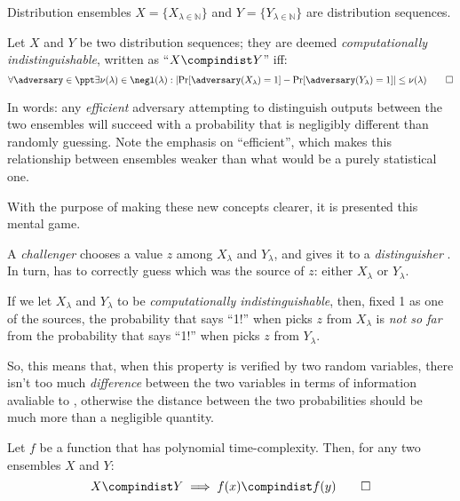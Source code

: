 Distribution ensembles $X = \{X_{\lambda \in \mathbb{N}}\}$ and $Y = \{Y_{\lambda \in \mathbb{N}}\}$ are distribution sequences.

\begin{definition}
    Let $X$ and $Y$ be two distribution sequences; they are deemed \emph{computationally indistinguishable}, written as ``$X \compindist Y$'' iff:
    \[
        \forall \adversary \in \ppt \exists \nu(\lambda) \in \negl(\lambda) : \left|\Pr[\adversary(X_\lambda) = 1] - \Pr[\adversary(Y_\lambda) = 1]\right| \leq \nu(\lambda) \qedhere
    \]
\end{definition}

In words: any \emph{efficient} adversary attempting to distinguish outputs between the two ensembles will succeed with a probability that is negligibly different than randomly guessing. Note the emphasis on ``efficient'', which makes this relationship between ensembles weaker than what would be a purely statistical one.

With the purpose of making these new concepts clearer, it is presented this mental game.


A \emph{challenger} \challenger{} chooses a value $z$ among $X_\lambda$ and $Y_\lambda$, and gives it to a \emph{distinguisher} \distinguisher{}. In turn, \distinguisher{} has to correctly guess which was the source of $z$: either $X_\lambda$ or $Y_\lambda$. 

If we let $X_\lambda$ and $Y_\lambda$ to be \emph{computationally indistinguishable}, then, fixed 1 as one of the sources, the probability that \distinguisher{} says ``1!'' when \challenger{} picks $z$ from $X_\lambda$ is \emph{not so far} from the probability that \distinguisher{} says ``1!'' when \challenger{} picks $z$ from $Y_\lambda$.

So, this means that, when this property is verified by two random variables, there isn't too much \textit{difference} between the two variables in terms of information avaliable to \distinguisher{}, otherwise the distance between the two probabilities should be much more than a negligible quantity.

\begin{lemma} \label{lem:compmall}
    Let $f$ be a function that has polynomial time-complexity. Then, for any two ensembles $X$ and $Y$:
    \[
        X \compindist Y \implies f(x) \compindist f(y) \qedhere
    \]
\end{lemma}

